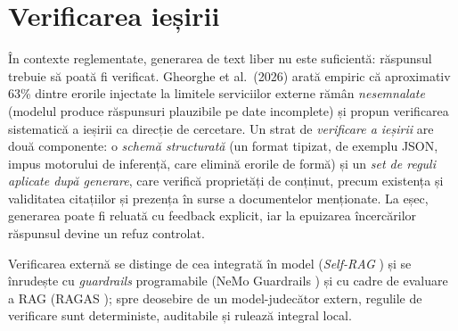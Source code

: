 \section{Verificarea ieșirii}
\label{sec:contracte}

În contexte reglementate, generarea de text liber nu este suficientă: răspunsul trebuie să poată fi verificat. Gheorghe et al.\ (2026) \cite{gheorghe2026robust} arată empiric că aproximativ 63\% dintre erorile injectate la limitele serviciilor externe rămân \emph{nesemnalate} (modelul produce răspunsuri plauzibile pe date incomplete) și propun verificarea sistematică a ieșirii ca direcție de cercetare. Un strat de \emph{verificare a ieșirii} are două componente: o \emph{schemă structurată} (un format tipizat, de exemplu JSON, impus motorului de inferență, care elimină erorile de formă) și un \emph{set de reguli aplicate după generare}, care verifică proprietăți de conținut, precum existența și validitatea citațiilor și prezența în surse a documentelor menționate. La eșec, generarea poate fi reluată cu feedback explicit, iar la epuizarea încercărilor răspunsul devine un refuz controlat.

Verificarea externă se distinge de cea integrată în model (\emph{Self-RAG} \cite{asai2024selfrag}) și se înrudește cu \emph{guardrails} programabile (NeMo Guardrails \cite{rebedea2023nemo}) și cu cadre de evaluare a RAG (RAGAS \cite{es2024ragas}); spre deosebire de un model-judecător extern, regulile de verificare sunt deterministe, auditabile și rulează integral local.
